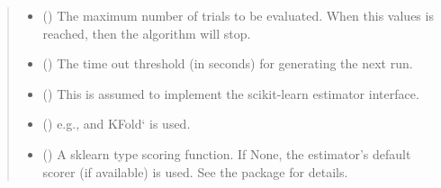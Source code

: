 \documentclass[letterpaper,10pt,english]{sphinxmanual}
\begin{document}
\begin{fulllineitems}
\begin{quote}
\begin{description}
\begin{itemize}
\item {} 
 (\sphinxstyleliteralemphasis{\sphinxupquote{, }}\sphinxstyleliteralemphasis{\sphinxupquote{, }}) \textendash{} The maximum number of trials to be evaluated. When this values is reached, 
then the algorithm will stop.

\item {} 
 (\sphinxstyleliteralemphasis{\sphinxupquote{, }}\sphinxstyleliteralemphasis{\sphinxupquote{, }}) \textendash{} The time out threshold (in seconds) for generating the next run.

\item {} 
 () \textendash{} This is assumed to implement the scikit-learn estimator interface.

\item {} 
 (\sphinxstyleliteralemphasis{\sphinxupquote{, }}) \textendash{} e.g.,  and KFold{}` is used.

\item {} 
 (\sphinxstyleliteralemphasis{\sphinxupquote{, }}\sphinxstyleliteralemphasis{\sphinxupquote{, }}\sphinxstyleliteralemphasis{\sphinxupquote{, }}\sphinxstyleliteralemphasis{\sphinxupquote{, }}\sphinxstyleliteralemphasis{\sphinxupquote{, }}) \textendash{} A sklearn type scoring function. 
If None, the estimator’s default scorer (if available) is used. See the package  for details.


\end{itemize}
\end{description}
\end{quote}
\end{fulllineitems}
\end{document}
